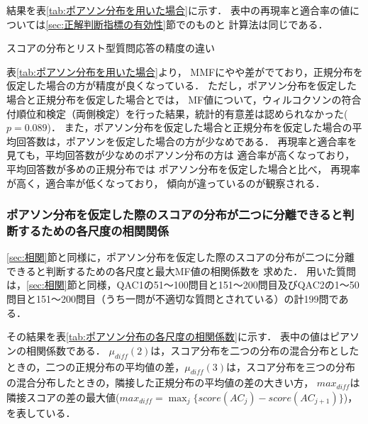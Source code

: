 \documentclass[japanese]{jnlp_1.4}
\begin{document}
結果を表\ref{tab:ポアソン分布を用いた場合}に示す．
表中の再現率と適合率の値については\ref{sec:正解判断指標の有効性}節でのものと
計算法は同じである．

\begin{table}[b]
\caption{スコアの分布とリスト型質問応答の精度の違い}
\label{tab:ポアソン分布を用いた場合}
\begin{center}

\end{center}
\end{table}

表\ref{tab:ポアソン分布を用いた場合}より，
MMFにやや差がでており，正規分布を仮定した場合の方が精度が良くなっている．
ただし，ポアソン分布を仮定した場合と正規分布を仮定した場合とでは，
MF値について，ウィルコクソンの符合付順位和検定（両側検定）を行った結果，統計的有意差は認められなかった($p=0.089$)．
また，ポアソン分布を仮定した場合と正規分布を仮定した場合の平均回答数は，ポアソンを仮定した場合の方が少なめである．
再現率と適合率を見ても，平均回答数が少なめのポアソン分布の方は
適合率が高くなっており，平均回答数が多めの正規分布では
ポアソン分布を仮定した場合と比べ，
再現率が高く，適合率が低くなっており，
傾向が違っているのが観察される．


\subsubsection{ポアソン分布を仮定した際のスコアの分布が二つに分離できると判断するための各尺度の相関関係}

\ref{sec:相関}節と同様に，ポアソン分布を仮定した際のスコアの分布が二つに分離できると判断するための各尺度と最大MF値の相関係数を
求めた．
用いた質問は，\ref{sec:相関}節と同様，QAC1の51〜100問目と151〜200問目及びQAC2の1〜50問目と151〜200問目（うち一問が不適切な質問とされている）の計199問である．

\begin{table}[t]
\label{tab:ポアソン分布の各尺度の相関係数}
\begin{center}

\end{center}
\end{table}

その結果を表\ref{tab:ポアソン分布の各尺度の相関係数}に示す．
表中の値はピアソンの相関係数である．
$\mu_{\mathit{diff}}(2)$は，スコア分布を二つの分布の混合分布としたときの，二つの正規分布の平均値の差，$\mu_{\mathit{diff}}(3)$は，スコア分布を三つの分布の混合分布したときの，隣接した正規分布の平均値の差の大きい方，
$max_{\mathit{diff}}$は隣接スコアの差の最大値($max_{\mathit{diff}}=\max_j \{score(AC_j)-score(AC_{j+1})\}$)，を表している．
\end{document}
